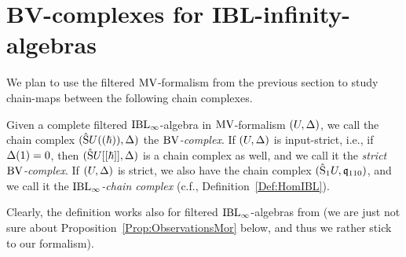 \documentclass[\MainFolder/Text.tex]{subfiles}
\begin{document}
\section{BV-complexes for IBL-infinity-algebras}\label{Sec:BVCompl}

We plan to use the filtered $\mathrm{MV}$-formalism from the previous section to study chain-maps between the following chain complexes.

\begin{Definition}\label{Def:BVCompl}
Given a complete filtered $\mathrm{IBL}_\infty$-algebra in $\mathrm{MV}$-formalism $(U,\operatorname{\Delta})$, we call the chain complex $(\hat{\mathrm{S}}U((\hbar)),\operatorname{\Delta})$ the \emph{$\mathrm{BV}$-complex}. If $(U,\operatorname{\Delta})$ is input-strict, i.e., if $\operatorname{\Delta}(1) = 0$, then $(\hat{\mathrm{S}}U[[\hbar]],\operatorname{\Delta})$ is a chain complex as well, and we call it the \emph{strict $\mathrm{BV}$-complex}. If $(U,\operatorname{\Delta})$ is strict, we also have the chain complex $(\hat{\mathrm{S}}_1 U, \mathfrak{q}_{110})$, and we call it the \emph{$\mathrm{IBL}_\infty$-chain complex} (c.f., Definition~\ref{Def:HomIBL}).
\end{Definition}

Clearly, the definition works also for filtered $\mathrm{IBL}_\infty$-algebras from \cite{Cieliebak2015} (we are just not sure about Proposition~\ref{Prop:ObservationsMor} below, and thus we rather stick to our formalism).
\end{document}
